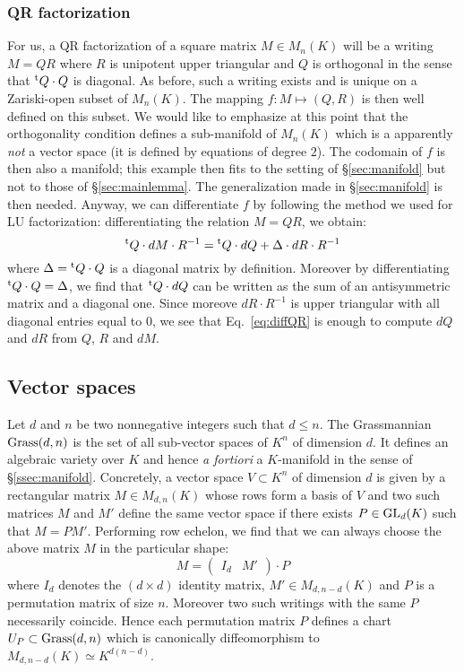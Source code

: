 \documentclass{lms}
\begin{document}
\subsubsection*{QR factorization}

For us, a QR factorization of a square matrix $M \in M_n(K)$ will be
a writing $M = QR$ where $R$ is unipotent upper triangular and $Q$ is
orthogonal in the sense that ${}^{\text t} Q \cdot Q$ is diagonal. As before, such 
a writing exists and is unique on a Zariski-open subset of $M_n(K)$. The
mapping $f : M \mapsto (Q,R)$ is then well defined on this subset. We 
would like to emphasize at this point that the orthogonality condition
defines a sub-manifold of $M_n(K)$ which is a apparently \emph{not} a
vector space (it is defined by equations of degree $2$). The codomain
of $f$ is then also a manifold; this example then fits to the setting
of \S \ref{sec:manifold} but not to those of \S \ref{sec:mainlemma}. 
The generalization made in \S \ref{sec:manifold} is then needed.
Anyway, we can differentiate $f$ by following the method we used for LU 
factorization: differentiating the relation $M = QR$, we obtain:
\begin{equation}
\label{eq:diffQR}
{}^{\text t} Q \cdot dM \cdot R^{-1} = {}^{\text t} Q \cdot dQ + \Delta \cdot dR 
\cdot R^{-1}
\end{equation}
where $\Delta = {}^{\text t} Q \cdot Q$ is a diagonal matrix by definition.
Moreover by differentiating ${}^{\text t} Q \cdot Q = \Delta$, we find that
${}^{\text t} Q \cdot dQ$ can be written as the sum of an antisymmetric 
matrix and a diagonal one. Since moreove $dR \cdot R^{-1}$ is upper
triangular with all diagonal entries equal to $0$, we see that 
Eq.~\eqref{eq:diffQR} is enough to compute $dQ$ and $dR$ from $Q$, $R$ 
and $dM$.

\subsection{Vector spaces}

Let $d$ and $n$ be two nonnegative integers such that $d \leq n$. The 
Grassmannian $\text{\rm Grass}(d,n)$ is the set of all sub-vector spaces of $K^n$ 
of dimension $d$. It defines an algebraic variety over $K$ and hence
\emph{a fortiori} a $K$-manifold in the sense of \S \ref{ssec:manifold}.
Concretely, a vector space $V \subset K^n$ of dimension $d$ is given by 
a rectangular matrix $M \in M_{d,n}(K)$ whose rows form a basis of $V$ 
and two such matrices $M$ and $M'$ define the same vector space if there 
exists $P \in \text{\rm GL}_d(K)$ such that $M = P M'$. Performing row echelon, we 
find that we can always choose the above matrix $M$ in the particular
shape:
$$M = \begin{pmatrix} I_d & M' \end{pmatrix} \cdot P$$
where $I_d$ denotes the $(d \times d)$ identity matrix, $M' \in M_{d, 
n-d}(K)$ and $P$ is a permutation matrix of size $n$. Moreover two 
such writings with the same $P$ necessarily coincide. Hence each 
permutation matrix $P$ defines a chart $U_P \subset \text{\rm Grass}(d,n)$ which
is canonically diffeomorphism to $M_{d, n-d}(K) \simeq K^{d(n-d)}$.
\end{document}
